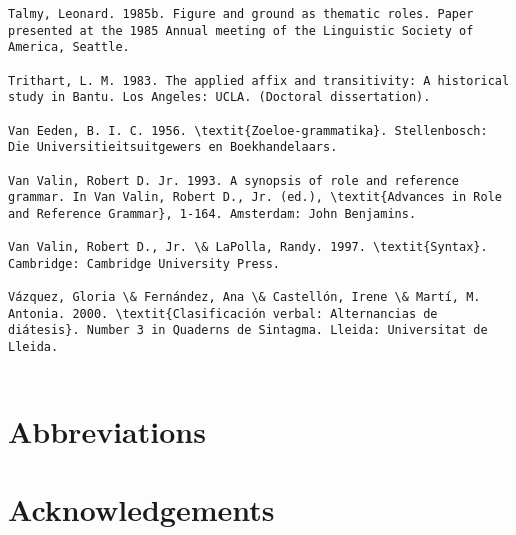 \documentclass[output=paper]{langsci/langscibook}
\begin{document}
\begin{verbatim}
Talmy, Leonard. 1985b. Figure and ground as thematic roles. Paper presented at the 1985 Annual meeting of the Linguistic Society of America, Seattle.

Trithart, L. M. 1983. The applied affix and transitivity: A historical study in Bantu. Los Angeles: UCLA. (Doctoral dissertation).

Van Eeden, B. I. C. 1956. \textit{Zoeloe-grammatika}. Stellenbosch: Die Universitieitsuitgewers en Boekhandelaars.

Van Valin, Robert D. Jr. 1993. A synopsis of role and reference grammar. In Van Valin, Robert D., Jr. (ed.), \textit{Advances in Role and Reference Grammar}, 1-164. Amsterdam: John Benjamins.

Van Valin, Robert D., Jr. \& LaPolla, Randy. 1997. \textit{Syntax}. Cambridge: Cambridge University Press.

Vázquez, Gloria \& Fernández, Ana \& Castellón, Irene \& Martí, M. Antonia. 2000. \textit{Clasificación verbal: Alternancias de diátesis}. Number 3 in Quaderns de Sintagma. Lleida: Universitat de Lleida.


\end{verbatim}

\section*{Abbreviations}
\section*{Acknowledgements}

\printbibliography[heading=subbibliography,notkeyword=this]
\end{document}
